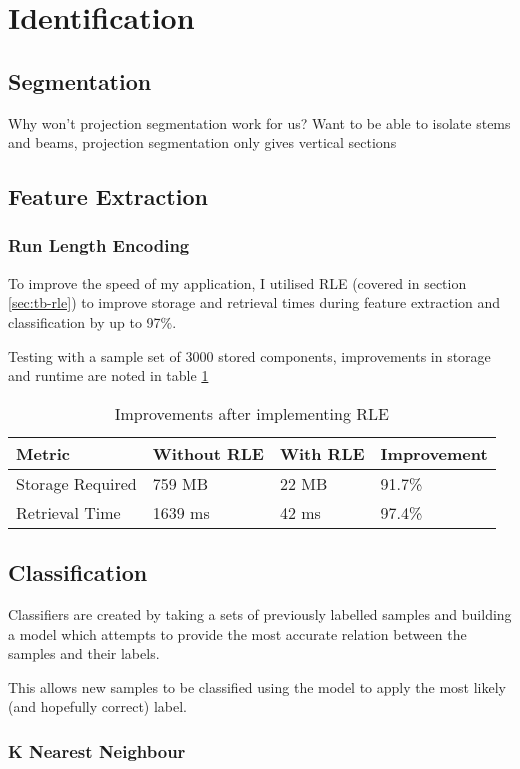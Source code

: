 \section{Identification}


\subsection{Segmentation}

Why won't projection segmentation work for us? Want to be able to isolate stems and beams, projection segmentation only gives vertical sections


\subsection{Feature Extraction}

\subsubsection{Run Length Encoding}
To improve the speed of my application, I utilised \acrfull{RLE} (covered in section \ref{sec:tb-rle}) to improve storage and retrieval times during feature extraction and classification by up to 97\%.

Testing with a sample set of 3000 stored components, improvements in storage and runtime are noted in table \ref{table:rle-improvement}

\begin{table}[h]

    \begin{tabularx}{\textwidth}{ X X X X }
    \toprule
    Metric                  & Without RLE   & With RLE   & Improvement \\
    \midrule
    Storage Required        & 759 MB        & 22 MB      & 91.7\%      \\
    Retrieval Time          & 1639 ms       & 42 ms      & 97.4\% \\
    \bottomrule
    \end{tabularx}

    \label{table:rle-improvement}
    \caption{Improvements after implementing RLE}
\end{table}

\subsection{Classification}
\label{sec:implementation-classification}

Classifiers are created by taking a sets of previously labelled samples and building a model which attempts to provide the most accurate relation between the samples and their labels.

This allows new samples to be classified using the model to apply the most likely (and hopefully correct) label.

\subsubsection{K Nearest Neighbour}



